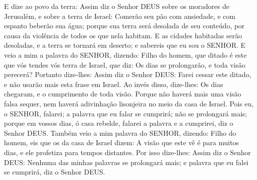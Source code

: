 {  E dize ao povo da terra: Assim diz o Senhor DEUS sobre os moradores de Jerusalém, e sobre a terra de Israel: Comerão seu pão com ansiedade, e com espanto beberão sua água; porque sua terra será desolada de seu conteúdo, por causa da violência de todos os que nela habitam.
  E as cidades habitadas serão desoladas, e a terra se tornará em deserto; e sabereis que eu sou o SENHOR.
  E veio a mim a palavra do SENHOR, dizendo:
  Filho do homem, que ditado é este que vós tendes vós terra de Israel, que diz: Os dias se prolongarão, e toda visão perecerá?
  Portanto dize-lhes: Assim diz o Senhor DEUS: Farei cessar este ditado, e não usarão mais esta frase em Israel. Ao invés disso, dize-lhes: Os dias chegaram, e o cumprimento de toda visão.
  Porque não haverá mais uma visão falsa sequer, nem haverá adivinhação lisonjeira no meio da casa de Israel.
  Pois eu, o SENHOR, falarei; a palavra que eu falar se cumprirá; não se prolongará mais; porque em vossos dias, ó casa rebelde, falarei a palavra e a cumprirei, diz o Senhor DEUS.
  Também veio a mim palavra do SENHOR, dizendo:
  Filho do homem, eis que os da casa de Israel dizem: A visão que este vê é para muitos dias, e ele profetiza para tempos distantes.
  Por isso dize-lhes: Assim diz o Senhor DEUS: Nenhuma das minhas palavras se prolongará mais; e palavra que eu falei se cumprirá, diz o Senhor DEUS.
\par }

